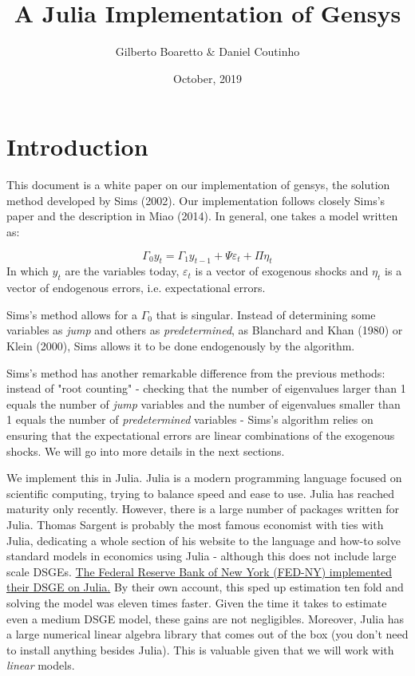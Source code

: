 \documentclass[12pt,a4paper]{article}
\title{ A Julia Implementation of Gensys }
\author{ Gilberto Boaretto & Daniel Coutinho }
\date{ October, 2019 }
\begin{document}
\maketitle

\section{Introduction}
This document is a white paper on our implementation of gensys, the solution method developed by Sims (2002). Our implementation follows closely Sims's paper and the description in Miao (2014). In general, one takes a model written as:

\[
\Gamma_0 y_t = \Gamma_1 y_{t-1} + \Psi \varepsilon_t + \Pi \eta_t
\]
In which $y_t$ are the variables today, $\varepsilon_t$ is a vector of exogenous shocks and $\eta_t$ is a vector of endogenous errors, i.e. expectational errors.

Sims's method allows for a $\Gamma_0$ that is singular. Instead of determining some variables as \emph{jump} and others as \emph{predetermined}, as Blanchard and Khan (1980) or Klein (2000), Sims allows it to be done endogenously by the algorithm.

Sims's method has another remarkable difference from the previous methods: instead of "root counting" - checking that the number of eigenvalues larger than 1 equals the number of \emph{jump} variables and the number of eigenvalues smaller than 1 equals the number of \emph{predetermined} variables - Sims's algorithm relies on ensuring that the expectational errors are linear combinations of the exogenous shocks. We will go into more details in the next sections.

We implement this in Julia. Julia is a modern programming language focused on scientific computing, trying to balance speed and ease to use. Julia has reached maturity only recently. However, there is a large number of packages written for Julia. Thomas Sargent is probably the most famous economist with ties with Julia, dedicating a whole section of his website to the language and how-to solve standard models in economics using Julia - although this does not include large scale DSGEs. \href{https://juliacomputing.com/case-studies/ny-fed.html}{The Federal Reserve Bank of New York (FED-NY) implemented their DSGE on Julia.} By their own account, this sped up estimation ten fold and solving the model was eleven times faster. Given the time it takes to estimate even a medium DSGE model, these gains are not negligibles. Moreover, Julia has a large numerical linear algebra library that comes out of the box (you don't need to install anything besides Julia). This is valuable given that we will work with \emph{linear} models.
\end{document}
